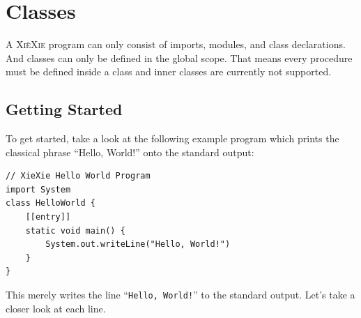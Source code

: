 \documentclass{report}
\def\xiexie{\textsc{Xi\`eXie}\xspace}
\begin{document}

\chapter{Classes}
\label{ch:classes}

A \xiexie program can only consist of imports, modules, and class declarations. And classes can only be defined
in the global scope. That means every procedure must be defined inside a class and inner classes are currently not supported.



\section{Getting Started}

To get started, take a look at the following example program which prints the classical phrase ``Hello, World!''
onto the standard output:
\begin{lstlisting}
// XieXie Hello World Program
import System
class HelloWorld {
    [[entry]]
    static void main() {
        System.out.writeLine("Hello, World!")
    }
}
\end{lstlisting}
This merely writes the line ``\texttt{Hello, World!}'' to the standard output. Let's take a closer look at each line.
\end{document}
